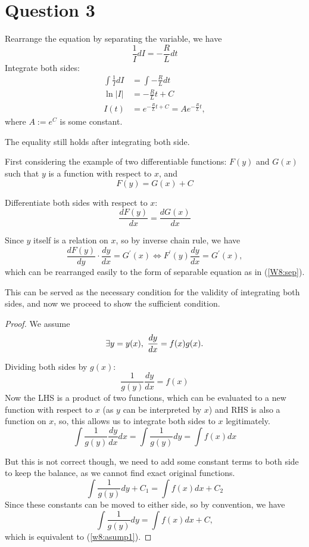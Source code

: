 \documentclass[12pt,a4paper]{article}
\begin{document}
\section*{Question 3}
\begin{solution}
Rearrange the equation by separating the variable, we have
\[
\frac{1}{I}dI = -\frac{R}{L}dt
\]
Integrate both sides:
\begin{align*}
\int \frac{1}{I} dI & =\int -\frac{R}{L} dt\\
\ln |I| & =-\frac{R}{L} t + C\\
I(t) & =e^{-\frac{R}{L} t + C} = Ae^{-\frac{R}{L} t},
\end{align*}
where $A := e^C$ is some constant.

\begin{remark}
The equality still holds after integrating both side.

First considering the example of two differentiable functions: $F(y)$ and $G(x)$ such that $y$ is a function with respect to $x$, and 
\begin{equation}
\label{w8:asump1}
F(y) = G(x) + C
\end{equation}


Differentiate both sides with respect to $x$:
\[
\frac{d F(y)}{d x}=\frac{d G(x)}{d x}
\]

Since $y$ itself is a relation on $x$, so by inverse chain rule, we have
\[
\frac{d F(y)}{d y} \cdot \frac{d y}{d x}=G^{\prime}(x)
\iff
F^{\prime}(y) \frac{d y}{d x}=G^{\prime}(x),
\]
which can be rearranged easily to the form of separable equation as in (\ref{W8:sep}).

This can be served as the necessary condition for the validity of integrating both sides, and now we proceed to show the sufficient condition.
\begin{proof}
    We assume $$\exists y=y(x),\text{ } \frac{dy}{dx}=f(x)g(x).$$

    Dividing both sides by $g(x)$:
    \[
    \frac{1}{g(y)} \frac{d y}{d x}=f(x)
    \]
    Now the LHS is a product of two functions, which can be evaluated to a new function with respect to $x$ (as $y$ can be interpreted by $x$) and RHS is also a function on $x$, so, this allows us to integrate both sides to $x$ legitimately.
    \[
    \int \frac{1}{g(y)} \frac{d y}{d x} d x= \int \frac{1}{g(y)} dy= \int f(x) d x
    \]

    But this is not correct though, we need to add some constant terms to both side to keep the balance, as we cannot find exact original functions.
    \[
    \int \frac{1}{g(y)} dy + C_1 = \int f(x) d x + C_2
    \]
    Since these constants can be moved to either side, so by convention, we have
    \[
    \int \frac{1}{g(y)} dy = \int f(x) d x + C,
    \]
    which is equivalent to (\ref{w8:asump1}).
\end{proof}


\end{remark}
\end{solution}
\end{document}
